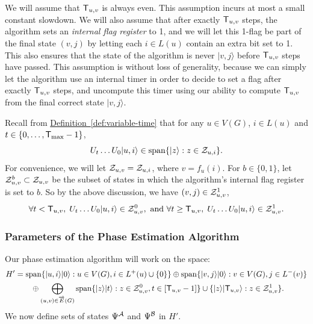 \documentclass{theoretics}
\newcommand{\defin}[1]{\hyperref[def:#1]{Definition~\ref*{def:#1}}}
\def\ket#1{{\lvert}#1\rangle}
\renewcommand{\>}{\rangle}
\newcommand{\<}{\langle}
\renewcommand{\(}{\left(}
\renewcommand{\)}{\right)}
\begin{document}
We will assume that ${\sf T}_{u,v}$ is always even. This assumption incurs at most a small constant slowdown. We will also assume that after exactly ${\sf T}_{u,v}$ steps, the algorithm sets an \emph{internal flag register} to 1, and we will let this 1-flag be part of the final state $(v,j)$ by letting each $i\in L(u)$ contain an extra bit set to 1. This also ensures that the state of the algorithm is never $\ket{v,j}$ before ${\sf T}_{u,v}$ steps have passed. This assumption is without loss of generality, because we can simply let the algorithm use an internal timer in order to decide to set a flag after exactly ${\sf T}_{u,v}$ steps, and uncompute this timer using our ability to compute ${\sf T}_{u,v}$ from the final correct state $\ket{v,j}$. 

Recall from \defin{variable-time} that for any $u\in V(G)$, $i\in L(u)$ and $t\in\{0,\dots,{\sf T}_{\max}-1\}$, 
$$U_t\dots U_0\ket{u,i}\in \mathrm{span}\{\ket{z}:z\in {\cal Z}_{u,i}\}.$$ 
For convenience, we will let ${\cal Z}_{u,v}={\cal Z}_{u,i}$, where $v=f_u(i)$.
For $b\in\{0,1\}$, let ${\cal Z}_{u,v}^b\subset {\cal Z}_{u,v}$ be the subset of states in which the algorithm's internal flag register is set to $b$. So by the above discussion, we have $(v,j)\in {\cal Z}_{u,v}^1$,
$$\forall t<{\sf T}_{u,v},\; U_t\dots U_0\ket{u,i} \in {\cal Z}_{u,v}^0,
\mbox{ and }
\forall t\geq {\sf T}_{u,v},\;
U_t\dots U_0\ket{u,i} \in {\cal Z}_{u,v}^1.$$ 


\subsubsection{Parameters of the Phase Estimation Algorithm}

Our phase estimation algorithm will work on the space:
\begin{equation}
\begin{split}
H'&=\mathrm{span}\{\ket{u,i}\ket{0}:u\in V(G),i\in L^+(u)\cup\{0\}\}\oplus\mathrm{span}\{\ket{v,j}\ket{0}:v\in V(G),j\in L^-(v)\}\\
&\qquad\oplus\bigoplus_{(u,v)\in\overrightarrow{E}(G)}\mathrm{span}\{\ket{z}\ket{t}:z\in{\cal Z}_{u,v}^0,t\in[{\sf T}_{u,v}-1]\}\cup\{\ket{z}\ket{{\sf T}_{u,v}}:z\in{\cal Z}_{u,v}^1\}.
\end{split}\label{eq:full-fwk-H}
\end{equation}
We now define sets of states $\Psi^{\cal A}$ and $\Psi^{\cal B}$ in $H'$.
\end{document}
